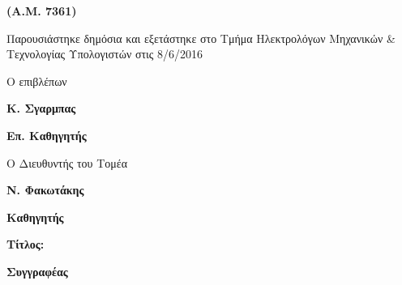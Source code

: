 {\begin {center}
  \vspace{\vs}
  \large\textbf{\theauthor}

  \large\textbf{(A.M. 7361)}

  \vspace{\vs}

{Παρουσιάστηκε δημόσια και εξετάστηκε στο Τμήμα
  Ηλεκτρολόγων Μηχανικών & Τεχνολογίας Υπολογιστών στις 8/6/2016}

  \vspace{\vs}
  \vspace{\vs}
  \begin{minipage}{0.45\textwidth}
        \begin{center}
                Ο επιβλέπων

                \vspace{\vs}
                \textbf{Κ. Σγαρμπας}

                \textbf{Επ. Καθηγητής}
        \end{center}
  \end{minipage}%
  \begin{minipage}{0.45\textwidth}
        \begin{center}
                Ο Διευθυντής του Τομέα

                \vspace{\vs}
                \textbf{Ν. Φακωτάκης}

                \textbf{Καθηγητής}
        \end{center}
  \end{minipage}%

  \end {center}

  \clearpage

\large\textbf{Τίτλος:}

\thetitle

    \begin{minipage}{.8\textwidth}
    \large\textbf{Συγγραφέας}

    \theauthor


\end{minipage}}
